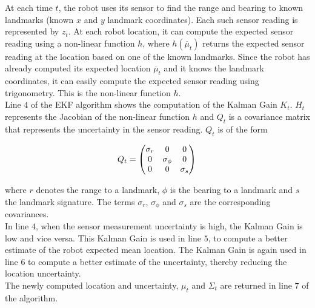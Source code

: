 \documentclass[conference]{IEEEtran}
\begin{document}
At each time $t$, the robot uses its sensor to find the range and bearing to known landmarks (known $x$ and $y$ landmark coordinates). Each such sensor reading is represented by $z_t$. At each robot location, it can compute the expected sensor reading using a non-linear function $h$, where $h(\overline \mu_t)$ returns the expected sensor reading at the location based on one of the known landmarks. Since the robot has already computed its expected location $\overline \mu_t$ and it knows the landmark coordinates, it can easily compute the expected sensor reading using trigonometry. This is the non-linear function $h$.\\

Line $4$ of the EKF algorithm shows the computation of the Kalman Gain $K_t$.  $H_t$ represents the Jacobian of the non-linear function $h$ and $Q_t$ is a covariance matrix that represents the uncertainty in the sensor reading. $Q_t$ is of the form

\begin{equation}\label{CovarianceMatrix}
Q_t = \begin{pmatrix}
		\sigma_r &0 &0\\
		0 &\sigma_{\phi} &0\\
		0 &0 &\sigma_{s}
	   \end{pmatrix}\\
\end{equation}

where $r$ denotes the range to a landmark, $\phi$ is the bearing to a landmark and $s$ the landmark signature. The terms $\sigma_r$, $\sigma_{\phi}$ and $\sigma_{s}$ are the corresponding covariances.\\

In line $4$, when the sensor measurement uncertainty is high, the Kalman Gain is low and vice versa. This Kalman Gain is used in line $5$, to compute a better estimate of the robot expected mean location. The Kalman Gain is again used in line $6$ to compute a better estimate of the uncertainty, thereby reducing the location uncertainty.\\

The newly computed location and uncertainty, $\mu_t$ and $\Sigma_t$ are returned in line $7$ of the algorithm.\\
\end{document}
